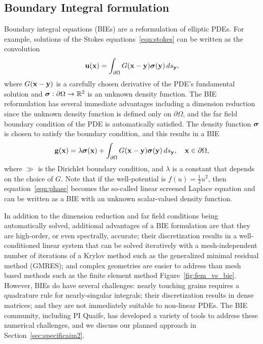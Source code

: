 \subsection{Boundary Integral formulation}
Boundary integral equations (BIEs) are a reformulation of elliptic PDEs.
For example, solutions of the Stokes equations~\eqref{eqn:stokes} can be
written as the convolution 
\begin{align*}
  \mathbf{u}(\mathbf{x}) = \int_{\partial\Omega} G(\mathbf{x} - \mathbf{y}) \boldsymbol{\sigma}(\mathbf{y}) \, ds_{\mathbf{y}},
\end{align*}
where $G(\mathbf{x} - \mathbf{y})$ is a carefully chosen derivative of the PDE's
fundamental solution and $\boldsymbol{\sigma}: \partial \Omega \rightarrow \mathbb{R}^2$ is
an unknown density function. The BIE reformulation has several immediate
advantages including a dimension reduction since the unknown density
function is defined only on $\partial \Omega$, and the far field
boundary condition of the PDE is automatically satisfied. The density
function $\boldsymbol{\sigma}$ is chosen to satisfy the boundary condition, and this
results in a BIE 
\begin{align*}
  \mathbf{g}(\mathbf{x}) = \lambda \boldsymbol{\sigma}(\mathbf{x}) + 
    \int_{\partial\Omega} G(\mathbf{x} - \mathbf{y}) \boldsymbol{\sigma}(\mathbf{y}) \, ds_{\mathbf{y}},
    \quad \mathbf{x} \in \partial\Omega,
\end{align*}
where $\gg$ is the Dirichlet boundary condition, and $\lambda$ is a
constant that depends on the choice of $G$. Note that if the
well-potential is $f(u) = \tfrac{1}{2}u^2$, then
equation~\eqref{eqn:phase} becomes the so-called linear screened Laplace
equation and can be written as a BIE with an unknown scalar-valued
density function.

In addition to the dimension reduction and far field conditions being
automatically solved, additional advantages of a BIE formulation are
that they are high-order, or even spectrally, accurate; their
discretization results in a well-conditioned linear system that can be
solved iteratively with a mesh-independent number of iterations of a
Krylov method such as the generalized minimal residual method (GMRES);
and complex geometries are easier to address than mesh based methods
such as the finite element method Figure~\ref{fig:fem_vs_bie}. However,
BIEs do have several challenges: nearly touching grains requires a
quadrature rule for nearly-singular integrals; their discretization
results in dense matrices; and they are not immediately suitable to
non-linear PDEs. The BIE community, including PI Quaife, has developed a
variety of tools to address these numerical challenges, and we discuss
our planned approach in Section~\ref{sec:specificaim2}.

